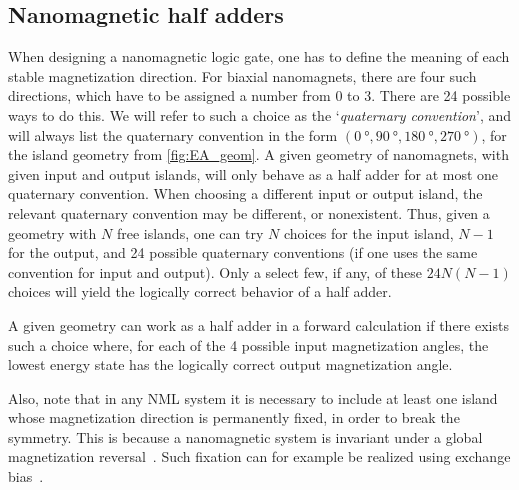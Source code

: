 \documentclass[twocolumn]{phdsymp}
\begin{document}
\subsection{Nanomagnetic half adders}
When designing a nanomagnetic logic gate, one has to define the meaning of each stable magnetization direction. For biaxial nanomagnets, there are four such directions, which have to be assigned a number from 0 to 3. There are 24 possible ways to do this. We will refer to such a choice as the `\textit{quaternary convention}', and will always list the quaternary convention in the form $(\SI{0}{\degree}, \SI{90}{\degree}, \SI{180}{\degree}, \SI{270}{\degree})$, for the island geometry from \cref{fig:EA_geom}. A given geometry of nanomagnets, with given input and output islands, will only behave as a half adder for at most one quaternary convention. When choosing a different input or output island, the relevant quaternary convention may be different, or nonexistent. Thus, given a geometry with $N$ free islands, one can try $N$ choices for the input island, $N-1$ for the output, and 24 possible quaternary conventions (if one uses the same convention for input and output). Only a select few, if any, of these $24N(N-1)$ choices will yield the logically correct behavior of a half adder. \par
A given geometry can work as a half adder in a forward calculation if there exists such a choice where, for each of the 4 possible input magnetization angles, the lowest energy state has the logically correct output magnetization angle. \par
Also, note that in any NML system it is necessary to include at least one island whose magnetization direction is permanently fixed, in order to break the symmetry. This is because a nanomagnetic system is invariant under a global magnetization reversal~\cite{GYP-18}. Such fixation can for example be realized using exchange bias~\cite{ExchangeBias,ExchangeBias_nanostructures,ExchangeBias_Mechanisms}.
\end{document}
